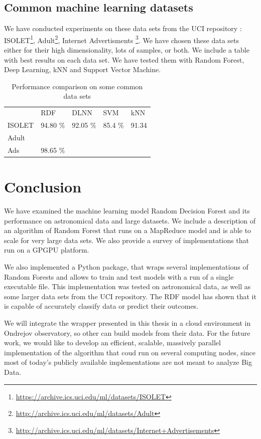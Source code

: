\documentclass[thesis=B,english]{FITthesis}[2012/10/20]
\begin{document}
\section{Common machine learning datasets}
We have conducted experiments on these data sets from the UCI repository \cite{uci} : ISOLET\footnote{\url{https://archive.ics.uci.edu/ml/datasets/ISOLET}}, Adult\footnote{\url{http://archive.ics.uci.edu/ml/datasets/Adult}}, Internet Advertisments \footnote{\url{http://archive.ics.uci.edu/ml/datasets/Internet+Advertisements}}. We have chosen these data sets either for their high dimensionality, lots of samples, or both. We include a table with best results on each data set. We have tested them with Random Forest, Deep Learning, kNN and Support Vector Machine. 
\begin{table}
    \begin{tabular}{lllll}
    ~      & RDF      & DLNN     & SVM     & kNN   \\
    ISOLET & 94.80 \% & 92.05 \% & 85.4 \% & 91.34 \\
    Adult  & ~        & ~        & ~       & ~     \\
    Ads    & 98.65 \% & ~        & ~       & ~     \\
    \end{tabular}
    \caption{Performance comparison on some common data sets}
\end{table}
 

\chapter{Conclusion}
We have examined the machine learning model Random Decision Forest and its performance on astronomical data and large datasets. We include a description of an algorithm of Random Forest that runs on a MapReduce model and is able to scale for very large data sets. We also provide a survey of implementations that run on a GPGPU platform.

We also implemented a Python package, that wraps several implementations of Random Forests and allows to train and test models with a run of a single executable file. This implementation was tested on astronomical data, as well as some larger data sets from the UCI repository. The RDF model has shown that it is capable of accurately classify data or predict their outcomes.

 We will integrate the wrapper presented in this thesis in a cloud environment in Ondrejov observatory, so other can build models from their data. For the future work, we would like to develop an efficient, scalable, massively parallel implementation of the algorithm that coud run on several computing nodes, since most of today's publicly available implementations are not meant to analyze Big Data.


\end{document}

